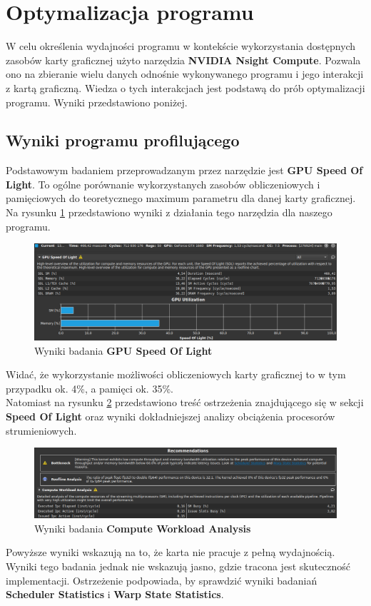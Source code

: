 \section{Optymalizacja programu}
W celu określenia wydajności programu w kontekście wykorzystania dostępnych zasobów karty graficznej użyto narzędzia \textbf{NVIDIA Nsight Compute}. Pozwala ono na zbieranie wielu danych odnośnie wykonywanego programu i jego interakcji z kartą graficzną. Wiedza o tych interakcjach jest podstawą do prób optymalizacji programu. Wyniki przedstawiono poniżej.

\subsection{Wyniki programu profilującego}

Podstawowym badaniem przeprowadzanym przez narzędzie jest \textbf{GPU Speed Of Light}. To ogólne porównanie wykorzystanych zasobów obliczeniowych i pamięciowych do teoretycznego maximum parametru dla danej karty graficznej.\\
Na rysunku \ref{fig:speed_of_light} przedstawiono wyniki z działania tego narzędzia dla naszego programu.
\begin{figure}[H]
    \centering
    \includegraphics[width=\linewidth]{images/SpeedOfLight.png}
    \caption{Wyniki badania \textbf{GPU Speed Of Light}}
    \label{fig:speed_of_light}
\end{figure}
Widać, że wykorzystanie możliwości obliczeniowych karty graficznej to w tym przypadku ok. 4\%, a pamięci ok. 35\%.\\
Natomiast na rysunku \ref{fig:sm_analisys} przedstawiono treść ostrzeżenia znajdującego się w sekcji \textbf{Speed Of Light} oraz wyniki dokładniejszej analizy obciążenia procesorów strumieniowych.
\begin{figure}[H]
    \centering
    \includegraphics[width=\linewidth]{images/SMAnalysis.png}
    \caption{Wyniki badania \textbf{Compute Workload Analysis}}
    \label{fig:sm_analisys}
\end{figure}
Powyższe wyniki wskazują na to, że karta nie pracuje z pełną wydajnością. Wyniki tego badania jednak nie wskazują jasno, gdzie tracona jest skuteczność implementacji. Ostrzeżenie podpowiada, by sprawdzić wyniki badaniań \textbf{Scheduler Statistics} i \textbf{Warp State Statistics}. 

